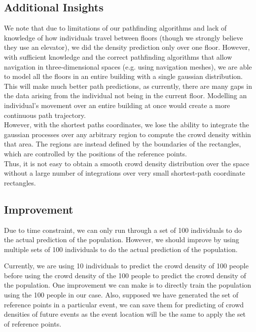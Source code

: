 \documentclass[letterpaper]{article}
\begin{document}
\subsection{Additional Insights}

We note that due to limitations of our pathfinding algorithms and lack of knowledge of how individuals travel between floors (though we strongly believe they use an elevator), we did the density prediction only over one floor. However, with sufficient knowledge and the correct pathfinding algorithms that allow navigation in three-dimensional spaces (e.g. using navigation meshes), we are able to model all the floors in an entire building with a single gaussian distribution. This will make much better path predictions, as currently, there are many gaps in the data arising from the individual not being in the current floor. Modelling an individual's movement over an entire building at once would create a more continuous path trajectory.\\

However, with the shortest paths coordinates, we lose the ability to integrate the gaussian processes over any arbitrary region to compute the crowd density within that area. The regions are instead defined by the boundaries of the rectangles, which are controlled by the positions of the reference points.\\

Thus, it is not easy to obtain a smooth crowd density distribution over the space without a large number of integrations over very small shortest-path coordinate rectangles.\\

\subsection{Improvement}

Due to time constraint, we can only run through a set of 100 individuals to do the actual prediction of the population. However, we should improve by using multiple sets of 100 individuals to do the actual prediction of the population.

Currently, we are using 10 individuals to predict the crowd density of 100 people before using the crowd density of the 100 people to predict the crowd density of the population. One improvement we can make is to directly train the population using the 100 people in our case. Also, supposed we have generated the set of reference points in a particular event, we can save them for predicting of crowd densities of future events as the event location will be the same to apply the set of reference points.
\end{document}
